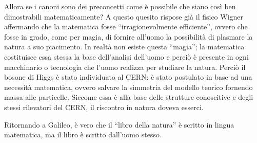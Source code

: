 \documentclass[11pt,a4paper]{article}
\begin{document}
Allora se i canoni sono dei preconcetti come è possibile che siano così ben dimostrabili matematicamente? A questo quesito rispose già il fisico Wigner affermando che la matematica fosse “irragionevolmente efficiente”, ovvero che fosse in grado, come per magia, di fornire all’uomo la possibilità di plasmare la natura a suo piacimento. In realtà non esiste questa “magia”; la matematica costituisce essa stessa la base dell’analisi dell’uomo e perciò è presente in ogni macchinario o tecnologia che l’uomo realizza per studiare la natura. Perciò il bosone di Higgs è stato individuato al CERN: è stato postulato in base ad una necessità matematica, ovvero salvare la simmetria del modello teorico fornendo massa alle particelle. Siccome essa è alla base delle strutture conoscitive e degli stessi rilevatori del CERN, il riscontro in natura doveva esserci. 

Ritornando a Galileo, è vero che il “libro della natura” è scritto in lingua matematica, ma il libro è scritto dall’uomo stesso.
\end{document}
